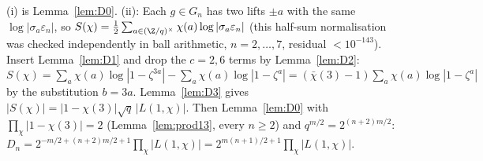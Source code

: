 (i) is Lemma~\ref{lem:D0}. (ii): Each $g\in G_n$ has two lifts $\pm a$ with the same $\log|\sigma_a\varepsilon_n|$, so $S(\chi)=\tfrac12\sum_{a\in(\Z/q)^\times}\chi(a)\log|\sigma_a\varepsilon_n|$ (this half-sum normalisation was checked independently in ball arithmetic, $n=2,\dots,7$, residual $<10^{-143}$). Insert Lemma~\ref{lem:D1} and drop the $c=2,6$ terms by Lemma~\ref{lem:D2}: $S(\chi)=\sum_a\chi(a)\log|1-\zeta^{3a}|-\sum_a\chi(a)\log|1-\zeta^a|=(\bar\chi(3)-1)\sum_a\chi(a)\log|1-\zeta^a|$ by the substitution $b=3a$. Lemma~\ref{lem:D3} gives $|S(\chi)|=|1-\chi(3)|\sqrt q\,|L(1,\chi)|$. Then Lemma~\ref{lem:D0} with $\prod_\chi|1-\chi(3)|=2$ (Lemma~\ref{lem:prod13}, every $n\ge2$) and $q^{m/2}=2^{(n+2)m/2}$: $D_n=2^{-m/2+(n+2)m/2+1}\prod_\chi|L(1,\chi)|=2^{m(n+1)/2+1}\prod_\chi|L(1,\chi)|$.

